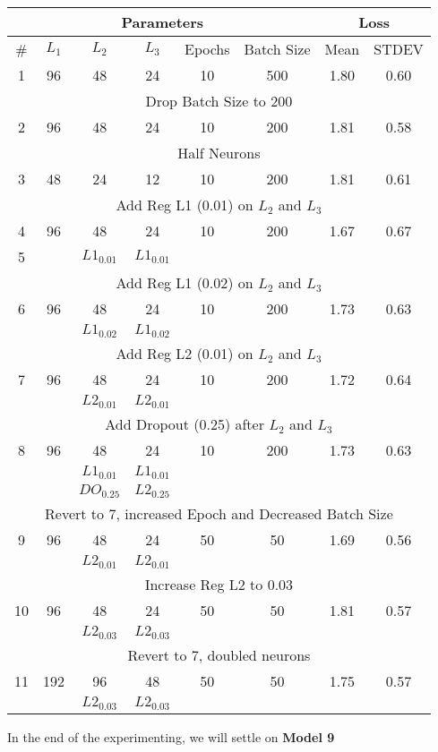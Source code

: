 \begin{tabular}{|c|c|c|c|c|c|c|c|} 
\hline
\multicolumn{6}{|c|}{Parameters} & \multicolumn{2}{|c|}{Loss}  \\
\hline
\# & $L_1$ & $L_2$ & $L_3$ & Epochs & Batch Size & Mean & STDEV \\
\hline
1 & 96 & 48 & 24 & 10 & 500 & 1.80 & 0.60 \\ \hline
\multicolumn{8}{|c|}{Drop Batch Size to 200}  \\ \hline
2 & 96 & 48 & 24 & 10 & 200 & 1.81 & 0.58 \\ \hline
\multicolumn{8}{|c|}{Half Neurons}  \\ \hline
3 & 48 & 24 & 12 & 10 & 200 & 1.81 & 0.61 \\ \hline
\multicolumn{8}{|c|}{Add Reg L1 (0.01) on $L_2$ and $L_3$}  \\ \hline
4 & 96 & 48 & 24 & 10 & 200 & 1.67 & 0.67  \\ \hline
5 & {} & $L1_{0.01}$ & $L1_{0.01}$ & {} & {} & {} & {} \\ \hline
\multicolumn{8}{|c|}{Add Reg L1 (0.02) on $L_2$ and $L_3$}  \\ \hline
6 & 96 & 48 & 24 & 10 & 200 & 1.73 & 0.63  \\ \hline
{} & {} & $L1_{0.02}$ & $L1_{0.02}$ & {} & {} & {} & {} \\ \hline
\multicolumn{8}{|c|}{Add Reg L2 (0.01) on $L_2$ and $L_3$}  \\ \hline
7 & 96 & 48 & 24 & 10 & 200 & 1.72 & 0.64  \\ \hline
{} & {} & $L2_{0.01}$ & $L2_{0.01}$ & {} & {} & {} & {} \\ \hline
\multicolumn{8}{|c|}{Add Dropout (0.25) after $L_2$ and $L_3$}  \\ \hline
8 & 96 & 48 & 24 & 10 & 200 & 1.73 & 0.63  \\ \hline
{} & {} & $L1_{0.01}$ & $L1_{0.01}$ & {} & {} & {} & {} \\ \hline
{} & {} & $DO_{0.25}$ & $L2_{0.25}$ & {} & {} & {} & {} \\ \hline
\multicolumn{8}{|c|}{Revert to 7, increased Epoch and Decreased Batch Size}  \\ \hline
9 & 96 & 48 & 24 & 50 & 50 & 1.69 & 0.56  \\ \hline
{} & {} & $L2_{0.01}$ & $L2_{0.01}$ & {} & {} & {} & {} \\ \hline
\multicolumn{8}{|c|}{Increase Reg L2 to 0.03}  \\ \hline
10 & 96 & 48 & 24 & 50 & 50 & 1.81 & 0.57  \\ \hline
{} & {} & $L2_{0.03}$ & $L2_{0.03}$ & {} & {} & {} & {} \\ \hline
\multicolumn{8}{|c|}{Revert to 7, doubled neurons}  \\ \hline
11 & 192 & 96 & 48 & 50 & 50 & 1.75 & 0.57  \\ \hline
{} & {} & $L2_{0.03}$ & $L2_{0.03}$ & {} & {} & {} & {} \\ \hline
\end{tabular}

In the end of the experimenting, we will settle on \textbf{Model 9}	


